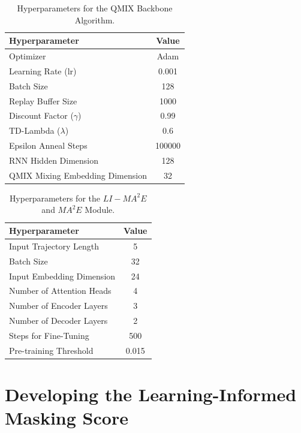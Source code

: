 \begin{table}[H]
\centering

\renewcommand{\arraystretch}{1.5} 
\begin{tabular}{lc} 
\hline
\textbf{Hyperparameter} & \textbf{Value} \\
\hline 
Optimizer & Adam \\
Learning Rate (lr) & 0.001 \\
Batch Size & 128 \\
Replay Buffer Size & 1000 \\
Discount Factor ($\gamma$) & 0.99 \\
TD-Lambda ($\lambda$) & 0.6 \\
Epsilon Anneal Steps & 100000 \\
RNN Hidden Dimension & 128 \\
QMIX Mixing Embedding Dimension & 32 \\
\hline
\end{tabular}
\caption{Hyperparameters for the QMIX Backbone Algorithm.}
\label{tab:qmix_hyperparams}
\end{table}

\begin{table}[H]
\centering

\renewcommand{\arraystretch}{1.5} 
\begin{tabular}{lc} 
\hline
\textbf{Hyperparameter} & \textbf{Value} \\
\hline 
Input Trajectory Length & 5 \\
Batch Size & 32 \\
Input Embedding Dimension & 24 \\
Number of Attention Heads & 4 \\
Number of Encoder Layers & 3 \\
Number of Decoder Layers & 2 \\
Steps for Fine-Tuning & 500 \\
Pre-training Threshold & 0.015 \\
\hline
\end{tabular}
\caption{Hyperparameters for the \textbf{$LI-{MA}^2E$} and \textbf{${MA}^2E$} Module.}
\label{tab:ma2e_hyperparams}
\end{table}
\section{Developing the Learning-Informed Masking Score}
\label{sec:scoring_methods}

